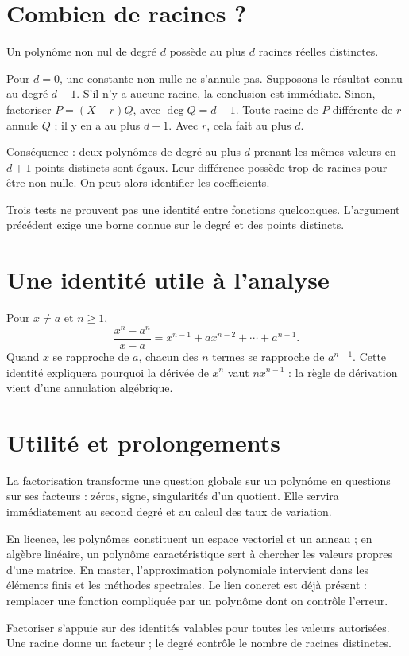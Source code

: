 \documentclass[../cours_1re.tex]{subfiles}
\begin{document}
\section{Combien de racines ?}
\begin{theoreme}[Complément]
Un polynôme non nul de degré $d$ possède au plus $d$ racines réelles distinctes.
\end{theoreme}
\begin{demonstration}
Pour $d=0$, une constante non nulle ne s'annule pas. Supposons le résultat connu au degré $d-1$. S'il n'y a aucune racine, la conclusion est immédiate. Sinon, factoriser $P=(X-r)Q$, avec $\deg Q=d-1$. Toute racine de $P$ différente de $r$ annule $Q$ ; il y en a au plus $d-1$. Avec $r$, cela fait au plus $d$.
\end{demonstration}
Conséquence : deux polynômes de degré au plus $d$ prenant les mêmes valeurs en $d+1$ points distincts sont égaux. Leur différence possède trop de racines pour être non nulle. On peut alors identifier les coefficients.
\begin{attention}
Trois tests ne prouvent pas une identité entre fonctions quelconques. L'argument précédent exige une borne connue sur le degré et des points distincts.
\end{attention}
\begin{finchapitre}
\section{Une identité utile à l'analyse}
\begin{demonstration}
Pour $x\ne a$ et $n\ge1$,
\[
\frac{x^n-a^n}{x-a}=x^{n-1}+ax^{n-2}+\cdots+a^{n-1}.
\]
Quand $x$ se rapproche de $a$, chacun des $n$ termes se rapproche de $a^{n-1}$. Cette identité expliquera pourquoi la dérivée de $x^n$ vaut $nx^{n-1}$ : la règle de dérivation vient d'une annulation algébrique.
\end{demonstration}


\section{Utilité et prolongements}
La factorisation transforme une question globale sur un polynôme en questions sur ses facteurs : zéros, signe, singularités d'un quotient. Elle servira immédiatement au second degré et au calcul des taux de variation.

En licence, les polynômes constituent un espace vectoriel et un anneau ; en algèbre linéaire, un polynôme caractéristique sert à chercher les valeurs propres d'une matrice. En master, l'approximation polynomiale intervient dans les éléments finis et les méthodes spectrales. Le lien concret est déjà présent : remplacer une fonction compliquée par un polynôme dont on contrôle l'erreur.
\begin{retenir}
Factoriser s'appuie sur des identités valables pour toutes les valeurs autorisées. Une racine donne un facteur ; le degré contrôle le nombre de racines distinctes.
\end{retenir}
\end{finchapitre}
\end{document}

